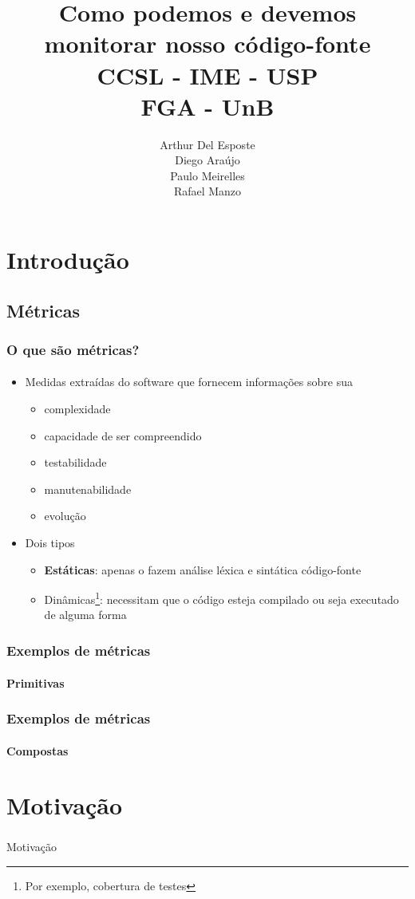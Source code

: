 \documentclass{beamer}
\title{
       \textbf{Como podemos e devemos monitorar nosso código-fonte} \\
       CCSL - IME - USP\\
       FGA - UnB
      }
\author{
        Arthur Del Esposte \\
        Diego Araújo \\
        Paulo Meirelles \\
        Rafael Manzo
       }
\begin{document}
\maketitle

\section{Introdução}
  \subsection{Métricas}
  \begin{frame}
    \frametitle{O que são métricas?}
    \framesubtitle{}

    \begin{itemize}
      \item Medidas extraídas do software que fornecem informações sobre sua
        \begin{itemize}
          \item complexidade
          \item capacidade de ser compreendido
          \item testabilidade
          \item manutenabilidade
          \item evolução
        \end{itemize}
      \item Dois tipos
        \begin{itemize}
          \item \textbf{Estáticas}: apenas o fazem análise léxica e sintática código-fonte
          \item Dinâmicas\footnote{Por exemplo, cobertura de testes}: necessitam que o código esteja compilado ou seja executado de alguma forma
        \end{itemize}
    \end{itemize}
  \end{frame}

  \begin{frame}
    \frametitle{Exemplos de métricas}
    \framesubtitle{Primitivas}
  \end{frame}

  \begin{frame}
    \frametitle{Exemplos de métricas}
    \framesubtitle{Compostas}
  \end{frame}

\section{Motivação}
\begin{frame}
  \frametitle{}
  \framesubtitle{}

  Motivação
\end{frame}
\end{document}
